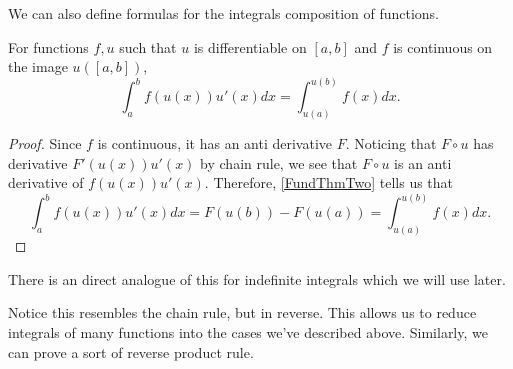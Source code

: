 


We can also define formulas for the integrals composition of functions.

\begin{thm}[$u$-Substitution]\label{USub}
  For functions $f,u$ such that $u$ is differentiable on $[a,b]$ and $f$ is continuous on the image $u([a,b])$,
  \begin{equation}
    \int_{a}^{b}f(u(x))u'(x)dx=\int_{u(a)}^{u(b)}f(x)dx.
  \end{equation}
\end{thm}

\begin{proof}
  Since $f$ is continuous, it has an anti derivative $F$. Noticing that $F\circ u$ has derivative $F'(u(x))u'(x)$ by chain rule, we see that $F\circ u$ is an anti derivative of $f(u(x))u'(x)$. Therefore, \cref{FundThmTwo} tells us that
  \begin{equation}
      \int_{a}^{b}f(u(x))u'(x)dx=F(u(b))-F(u(a))=\int_{u(a)}^{u(b)}f(x)dx.
  \end{equation}
\end{proof}
\begin{rem}
  There is an direct analogue of this for indefinite integrals which we will use later.
\end{rem}

Notice this resembles the chain rule, but in reverse. This allows us to reduce integrals of many functions into the cases we've described above. Similarly, we can prove a sort of reverse product rule.





